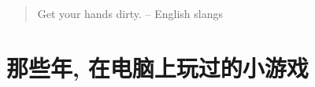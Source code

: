 \begin{quote}
	Get your hands dirty. \hfill -- English slangs
\end{quote}



\section{那些年, 在电脑上玩过的小游戏}



